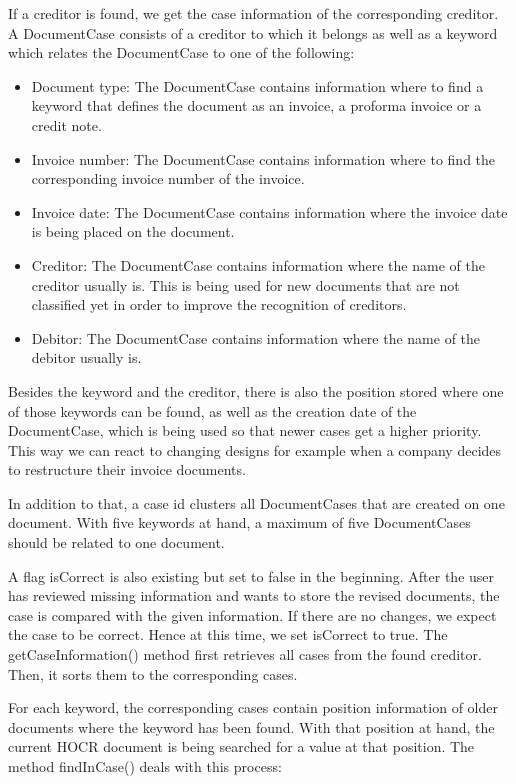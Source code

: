 If a creditor is found, we get the case information of the corresponding creditor. A DocumentCase consists of a creditor to which it belongs as well as a keyword which relates the DocumentCase to one of the following:
\begin{itemize}
	\item Document type: The DocumentCase contains information where to find a keyword that defines the document as an invoice, a proforma invoice or a credit note.
	\item Invoice number: The DocumentCase contains information where to find the corresponding invoice number of the invoice.
	\item Invoice date: The DocumentCase contains information where the invoice date is being placed on the document.
	\item Creditor: The DocumentCase contains information where the name of the creditor usually is. This is being used for new documents that are not classified yet in order to improve the recognition of creditors.
	\item Debitor: The DocumentCase contains information where the name of the debitor usually is.
\end{itemize}

Besides the keyword and the creditor, there is also the position stored where one of those keywords can be found, as well as the creation date of the DocumentCase, which is being used so that newer cases get a higher priority. This way we can react to changing designs for example when a company decides to restructure their invoice documents.

In addition to that, a case id clusters all DocumentCases that are created on one document. With five keywords at hand, a maximum of five DocumentCases should be related to one document.

A flag isCorrect is also existing but set to false in the beginning. After the user has reviewed missing information and wants to store the revised documents, the case is compared with the given information. If there are no changes, we expect the case to be correct. Hence at this time, we set isCorrect to true.
The getCaseInformation() method first retrieves all cases from the found creditor. Then, it sorts them to the corresponding cases.

For each keyword, the corresponding cases contain position information of older documents where the keyword has been found. With that position at hand, the current HOCR document is being searched for a value at that position. The method findInCase() deals with this process:


